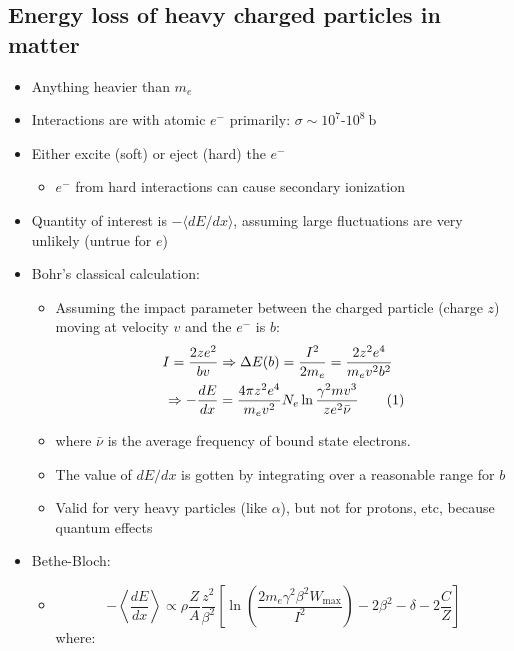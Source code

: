 \documentclass[11pt]{article}
\newcommand\numberthis{\addtocounter{equation}{1}\tag{\theequation}}
\newcommand{\nubar}{{\bar{\nu}}}
\newcommand{\ra}{\rangle}
\newcommand{\la}{\langle}
\newcommand{\dd}[2]{\dfrac{d #1}{d #2}}
\newcommand{\ba}{\text{b}}
\newcommand{\el}{\ensuremath{e^{-}}\xspace}
\begin{document}
\subsection{Energy loss of heavy charged particles in matter}
\begin{itemize}
  \item Anything heavier than $m_e$
  \item Interactions are with atomic $\el$ primarily: $\sigma \sim 10^7\text{-}10^8~\ba$
  \item Either excite (soft) or eject (hard) the $\el$
  \begin{itemize}
    \item $\el$ from hard interactions can cause secondary ionization
  \end{itemize}
  \item Quantity of interest is $-\la dE/dx\ra$, assuming large fluctuations are very unlikely (untrue for $e$)
  \item Bohr's classical calculation:
  \begin{itemize}
    \item Assuming the impact parameter between the charged particle (charge $z$) moving at velocity $v$ and the $\el$ is $b$:
    \begin{align*}
      I = \frac{2ze^2}{bv} &\Rightarrow \Delta E(b) = \frac{I^2}{2m_e} = \frac{2z^2e^4}{m_ev^2b^2}\\
      \Rightarrow - \dd{E}{x} & = \frac{4\pi z^2 e^4}{m_ev^2}N_e \ln \frac{\gamma^2 mv^3}{ze^2\nubar} \numberthis
    \end{align*}
    \item where $\nubar$ is the average frequency of bound state electrons. 
    \item The value of $dE/dx$ is gotten by integrating over a reasonable range for $b$ 
    \item Valid for very heavy particles (like $\alpha$), but not for protons, etc, because quantum effects
  \end{itemize}
  \item Bethe-Bloch:
  \begin{itemize}
    \item 
    \begin{equation}
      - \left\la \frac{dE}{dx} \right\ra \propto \rho \frac{Z}{A}\frac{z^2}{\beta^2} \left[\ln \left( \frac{2 m_e \gamma^2 \beta^2 W_{\max}}{I^2}\right) - 2\beta^2 - \delta - 2 \frac{C}{Z} \right]
    \end{equation}
    where:
    \begin{itemize}

\end{itemize}
\end{itemize}
\end{itemize}
\end{document}
